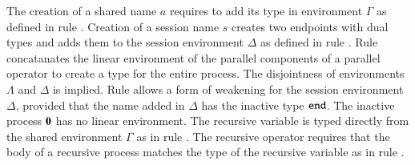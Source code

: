 The creation of a
shared name $a$ requires to add
its type in environment $\Gamma$ as defined in 
rule . 
Creation of a session name $s$
creates two endpoints with dual types and adds them to
the session environment 
$\Delta$ as defined in rule . 
Rule  concatanates the linear environment of
the parallel components of a parallel operator
to create a type for the entire process.
The disjointness of environments $\Lambda$ and $\Delta$
is implied. Rule  allows a form of weakening 
for the session environment $\Delta$, provided that
the name added in $\Delta$ has the inactive
type $\mathtt{end}$. The inactive process $\mathbf{0}$ has no
linear environment. The recursive variable is typed
directly from the shared environment $\Gamma$ as
in rule .
The recursive operator requires that the body of
a recursive process matches the type of the recursive
variable as in rule .

\begin{comment}
\subsection{Order of Types}

In~\cite{tlca07} the type syntax for values includes the definition
$U_1 \sharedop U_2$ and $U_1 \lollipop U_2$, that
allows us to define types of arbitrary order $k$.
An abstraction of $k$-order types requires to extend the syntax
to include higher-order applications:
\[
	\abs{z}{\binp{z}{x} \appl{x}{\abs{y} Q}}
\]
with with the type of $\abs{y}{Q}$ being of order
$k-1$. The type of of such an abstraction in the current setting would
be $\shot{U}$ (or $\lhot{U}$) with the order of the type being defined
as the number of nested higher-order types~\cite{San96int}.

In the type system we develop for the \HOp we only have
types of the form $\shot{C}$.
If we maintain the definition of counting the order
of the type as the nesting of higher-order types we
can still express $k$-order types, e.g:
\[
	\shot{(\btinp{U} \tinact)}
\]
with $U$ being of order $k-1$.
An $k$-order abstraction in \HOp would be:
\[
	\abs{z}{\binp{z}{x} \binp{x}{y} \appl{y}{n}}
\]
with $y$ being of order $k-1$.

\begin{definition}[Order of Value Type]\rm
	\label{def:order_type}
	Let type $U$ and value $V$ such that $\Gamma; \Lambda; \Delta \proves V \hastype U$.
	The order of $U$ is the number of using rule $\trule{Abs}$
	in the typing derivation $\Gamma; \Lambda; \Delta \proves V \hastype U$.
\end{definition}
\end{comment}

